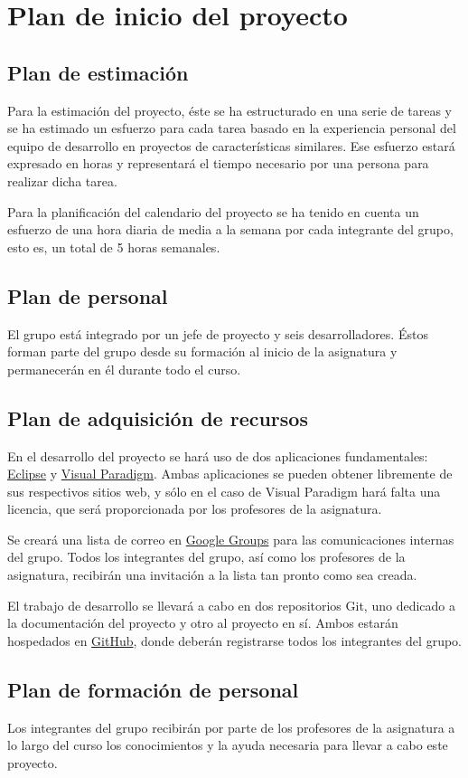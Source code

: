 \section{Plan de inicio del proyecto}

\subsection{Plan de estimación}

Para la estimación del proyecto, éste se ha estructurado en una serie de tareas
y se ha estimado un esfuerzo para cada tarea basado en la experiencia personal
del equipo de desarrollo en proyectos de características similares. Ese esfuerzo
estará expresado en horas y representará el tiempo necesario por una persona
para realizar dicha tarea.

Para la planificación del calendario del proyecto se ha tenido en cuenta un
esfuerzo de una hora diaria de media a la semana por cada integrante del grupo,
esto es, un total de 5 horas semanales.

\subsection{Plan de personal}

El grupo está integrado por un jefe de proyecto y seis desarrolladores. Éstos
forman parte del grupo desde su formación al inicio de la asignatura y
permanecerán en él durante todo el curso.

\subsection{Plan de adquisición de recursos}

En el desarrollo del proyecto se hará uso de dos aplicaciones fundamentales:
\href{http://www.eclipse.org}{Eclipse} y
\href{http://www.visual-paradigm.com}{Visual Paradigm}.
Ambas aplicaciones se pueden obtener libremente de sus respectivos sitios web,
y sólo en el caso de Visual Paradigm hará falta una licencia, que será
proporcionada por los profesores de la asignatura.

Se creará una lista de correo en \href{http://groups.google.com}{Google Groups}
para las comunicaciones internas del grupo. Todos los integrantes del grupo,
así como los profesores de la asignatura, recibirán una invitación a la lista
tan pronto como sea creada.

El trabajo de desarrollo se llevará a cabo en dos repositorios Git, uno dedicado
a la documentación del proyecto y otro al proyecto en sí. Ambos estarán
hospedados en \href{http://github.com}{GitHub}, donde deberán registrarse todos
los integrantes del grupo.

\subsection{Plan de formación de personal}

Los integrantes del grupo recibirán por parte de los profesores de la
asignatura a lo largo del curso los conocimientos y la ayuda necesaria para
llevar a cabo este proyecto.
